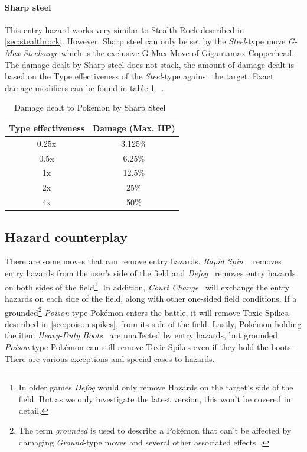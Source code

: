 \paragraph{Sharp steel}
This entry hazard works very similar to Stealth Rock described in \ref{sec:stealthrock}.
However, Sharp steel can only be set by the \textit{Steel}-type move
\textit{G-Max Steelsurge} which is the exclusive G-Max Move of Gigantamax Copperhead.
The damage dealt by Sharp steel does not stack, the amount of damage dealt is
based on the Type effectiveness of the \textit{Steel}-type against the target.
Exact damage modifiers can be found in table \ref{tab:sharp-steel-damage}
~\autocite{Bulbapedia:GMaxSteelsurge}.
\begin{table}[h]
	\label{tab:sharp-steel-damage}
	\centering
	\begin{tabular}{|c|c|}
		\hline
		\textbf{Type effectiveness} & \textbf{Damage (Max. \ac{HP}}) \\
		\hline 
		0.25x & 3.125\% \\ 
		\hline 
		0.5x &  6.25\% \\ 
		\hline 
		1x & 12.5\% \\
		\hline
		2x & 25\% \\
		\hline
		4x & 50\% \\
		\hline
	\end{tabular} 
	\caption{Damage dealt to Pokémon by Sharp Steel~\autocite{Bulbapedia:GMaxSteelsurge}}
\end{table}

\subsection{Hazard counterplay}
There are some moves that can remove entry hazards. \textit{Rapid Spin} 
~\autocite{Bulbapedia:RapidSpin} removes entry hazards from the user's side of the field and
\textit{Defog}~\autocite{Bulbapedia:Defog} removes entry hazards on both sides of the 
field\footnote{In older games \textit{Defog} would only remove Hazards on the
target's side of the field. But as we only investigate the latest version, this
won't be covered in detail.}. In addition, 
\textit{Court Change}~\autocite{Bulbapedia:CourtChange} will exchange the entry hazards
on each side of the field, along with other one-sided field conditions.
If a grounded\footnote{The term \textit{grounded} is used to describe a Pokémon that
can't be affected by damaging \textit{Ground}-type moves and several other associated 
effects~\autocite{Bulbapedia:Grounded}.}
\textit{Poison}-type Pokémon enters the battle, it will remove Toxic 
Spikes, described in \ref{sec:poison-spikes}, from its side of the field.
Lastly, Pokémon holding the item 
\textit{Heavy-Duty Boots}~\autocite{Bulbapedia:HeavyDutyBoots} are unaffected by
entry hazards, but grounded \textit{Poison}-type Pokémon can still remove
Toxic Spikes even if they hold the boots~\autocite{Bulbapedia:EntryHazards}.
There are various exceptions and special cases to hazards. 

